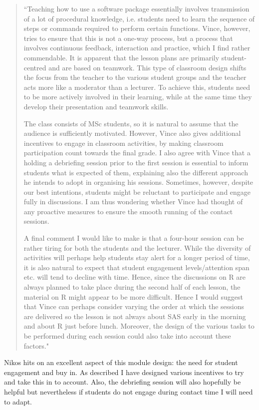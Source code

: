 \documentclass[a4paper,12pt]{article}
\begin{document}
\begin{quote}
``Teaching how to use a software package essentially involves transmission of a lot of procedural knowledge, i.e. students need to learn the sequence of steps or commands required to perform certain functions. Vince, however, tries to ensure that this is not a one-way process, but a process that involves continuous feedback, interaction and practice, which I find rather commendable. It is apparent that the lesson plans are primarily student-centred and are based on teamwork. This type of classroom design shifts the focus from the teacher to the various student groups and the teacher acts more like a moderator than a lecturer. To achieve this, students need to be more actively involved in their learning, while at the same time they develop their presentation and teamwork skills.

The class consists of MSc students, so it is natural to assume that the audience is sufficiently motivated. However, Vince also gives additional incentives to engage in classroom activities, by making classroom participation count towards the final grade. I also agree with Vince that a holding a debriefing session prior to the first session is essential to inform students what is expected of them, explaining also the different approach he intends to adopt in organising his sessions. Sometimes, however, despite our best intentions, students might be reluctant to participate and engage fully in discussions. I am thus wondering whether Vince had thought of any proactive measures to ensure the smooth running of the contact sessions.

A final comment I would like to make is that a four-hour session can be rather tiring for both the students and the lecturer. While the diversity of activities will perhaps help students stay alert for a longer period of time, it is also natural to expect that student engagement levels/attention span etc. will tend to decline with time. Hence, since the discussions on R are always planned to take place during the second half of each lesson, the material on R might appear to be more difficult. Hence I would suggest that Vince can perhaps consider varying the order at which the sessions are delivered so the lesson is not always about SAS early in the morning and about R just before lunch. Moreover, the design of the various tasks to be performed during each session could also take into account these factors."
\end{quote}

Nikos hits on an excellent aspect of this module design: the need for student engagement and buy in. As described I have designed various incentives to try and take this in to account. Also, the debriefing session will also hopefully be helpful but nevertheless if students do not engage during contact time I will need to adapt.\\
\end{document}
